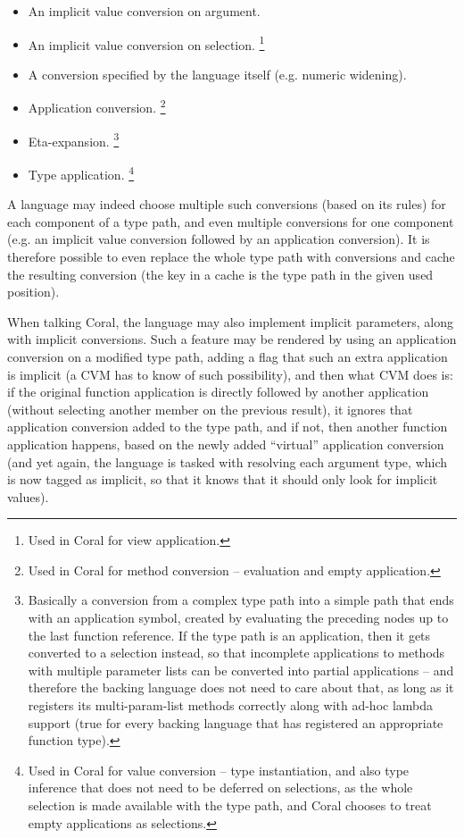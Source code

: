 \begin{itemize}
\item An implicit value conversion on argument. 
\item An implicit value conversion on selection. \footnote{Used in Coral for view application.}
\item A conversion specified by the language itself (e.g. numeric widening). 
\item Application conversion. \footnote{Used in Coral for method conversion -- evaluation and empty application.}
\item Eta-expansion. \footnote{Basically a conversion from a complex type path into a simple path that ends with an application symbol, created by evaluating the preceding nodes up to the last function reference. If the type path is an application, then it gets converted to a selection instead, so that incomplete applications to methods with multiple parameter lists can be converted into partial applications -- and therefore the backing language does not need to care about that, as long as it registers its multi-param-list methods correctly along with ad-hoc lambda support (true for every backing language that has registered an appropriate function type).}
\item Type application. \footnote{Used in Coral for value conversion -- type instantiation, and also type inference that does not need to be deferred on selections, as the whole selection is made available with the type path, and Coral chooses to treat empty applications as selections.}
\end{itemize}

A language may indeed choose multiple such conversions (based on its rules) for each component of a type path, and even multiple conversions for one component (e.g. an implicit value conversion followed by an application conversion). It is therefore possible to even replace the whole type path with conversions and cache the resulting conversion (the key in a cache is the type path in the given used position). 

When talking Coral, the language may also implement implicit parameters, along with implicit conversions. Such a feature may be rendered by using an application conversion on a modified type path, adding a flag that such an extra application is implicit (a CVM has to know of such possibility), and then what CVM does is: if the original function application is directly followed by another application (without selecting another member on the previous result), it ignores that application conversion added to the type path, and if not, then another function application happens, based on the newly added ``virtual'' application conversion (and yet again, the language is tasked with resolving each argument type, which is now tagged as implicit, so that it knows that it should only look for implicit values). 






